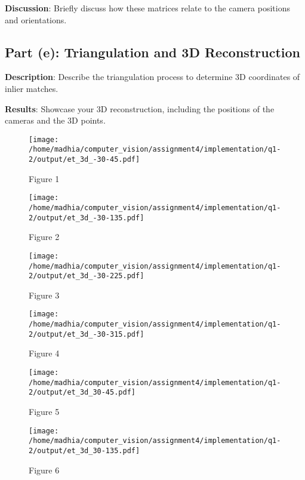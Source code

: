\documentclass{article}
\begin{document}
\textbf{Discussion}: Briefly discuss how these matrices relate to the camera positions and orientations.

\subsection{Part (e): Triangulation and 3D Reconstruction}
\textbf{Description}: Describe the triangulation process to determine 3D coordinates of inlier matches.

\textbf{Results}: Showcase your 3D reconstruction, including the positions of the cameras and the 3D points.

\begin{figure}[h!]
    \centering
    \begin{minipage}{0.4\textwidth}
        \centering
        \texttt{[image: /home/madhia/computer\_vision/assignment4/implementation/q1-2/output/et\_3d\_-30-45.pdf]}
        \caption{Figure 1}
    \end{minipage}%
    \begin{minipage}{0.4\textwidth}
        \centering
        \texttt{[image: /home/madhia/computer\_vision/assignment4/implementation/q1-2/output/et\_3d\_-30-135.pdf]}
        \caption{Figure 2}
    \end{minipage}%
\end{figure}

\begin{figure}[h!]
    \centering
    \begin{minipage}{0.4\textwidth}
        \centering
        \texttt{[image: /home/madhia/computer\_vision/assignment4/implementation/q1-2/output/et\_3d\_-30-225.pdf]}
        \caption{Figure 3}
    \end{minipage}%
    \begin{minipage}{0.4\textwidth}
        \centering
        \texttt{[image: /home/madhia/computer\_vision/assignment4/implementation/q1-2/output/et\_3d\_-30-315.pdf]}
        \caption{Figure 4}
    \end{minipage}%
\end{figure}
    
\begin{figure}[h!]
    \centering    
    \begin{minipage}{0.4\textwidth}
        \centering
        \texttt{[image: /home/madhia/computer\_vision/assignment4/implementation/q1-2/output/et\_3d\_30-45.pdf]}
        \caption{Figure 5}
    \end{minipage}%
    \begin{minipage}{0.4\textwidth}
        \centering
        \texttt{[image: /home/madhia/computer\_vision/assignment4/implementation/q1-2/output/et\_3d\_30-135.pdf]}
        \caption{Figure 6}
    \end{minipage}%
\end{figure}
    
\end{document}
